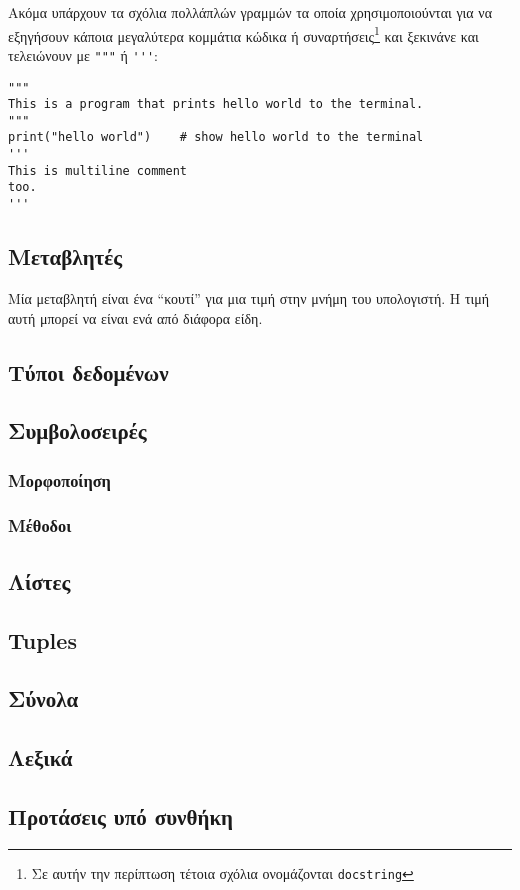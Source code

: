 \documentclass[14pt]{extreport}
\begin{document}
Ακόμα υπάρχουν τα σχόλια πολλάπλών γραμμών τα οποία χρησιμοποιούνται για να εξηγήσουν κάποια μεγαλύτερα κομμάτια κώδικα ή συναρτήσεις\footnote{Σε αυτήν την περίπτωση τέτοια σχόλια ονομάζονται \lstinline{docstring}} και ξεκινάνε και τελειώνουν με \lstinline{"""} ή \lstinline{'''}:

\begin{lstlisting}
"""
This is a program that prints hello world to the terminal.
"""
print("hello world")    # show hello world to the terminal
'''
This is multiline comment
too.
'''
\end{lstlisting}

\subsection{Μεταβλητές}

Μία μεταβλητή είναι ένα “κουτί” για μια τιμή στην μνήμη του υπολογιστή. Η τιμή αυτή μπορεί να είναι ενά από διάφορα είδη.


\subsection{Τύποι δεδομένων}
\subsection{Συμβολοσειρές}
\subsubsection{Μορφοποίηση}
\subsubsection{Μέθοδοι}
\subsection{Λίστες}
\subsection{Tuples}
\subsection{Σύνολα}
\subsection{Λεξικά}
\subsection{Προτάσεις υπό συνθήκη}
\end{document}
